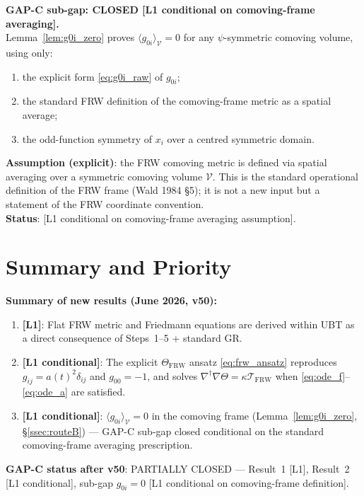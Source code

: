 \documentclass[12pt,a4paper]{article}
\theoremstyle{definition}
\theoremstyle{remark}
\begin{document}
\begin{resultbox}
\textbf{GAP-C sub-gap: CLOSED [L1 conditional on comoving-frame averaging].}\\[4pt]
Lemma~\ref{lem:g0i_zero} proves $\langle g_{0i}\rangle_{\mathcal{V}} = 0$ for
any $\psi$-symmetric comoving volume, using only:
\begin{enumerate}
  \item the explicit form \eqref{eq:g0i_raw} of $g_{0i}$;
  \item the standard FRW definition of the comoving-frame metric as a spatial average;
  \item the odd-function symmetry of $x_i$ over a centred symmetric domain.
\end{enumerate}
\textbf{Assumption (explicit)}: the FRW comoving metric is defined via
spatial averaging over a symmetric comoving volume $\mathcal{V}$.
This is the standard operational definition of the FRW frame (Wald 1984 §5);
it is not a new input but a statement of the FRW coordinate convention.\\[4pt]
\textbf{Status}: [L1 conditional on comoving-frame averaging assumption].
\end{resultbox}

\section{Summary and Priority}
\label{sec:summary}

\begin{resultbox}
\textbf{Summary of new results (June 2026, v50):}
\begin{enumerate}
  \item \textbf{[L1]}: Flat FRW metric and Friedmann equations are derived within UBT
        as a direct consequence of Steps~1--5 + standard GR.
  \item \textbf{[L1 conditional]}: The explicit $\Theta_{\mathrm{FRW}}$ ansatz
        \eqref{eq:frw_ansatz} reproduces $g_{ij}=a(t)^2\delta_{ij}$ and $g_{00}=-1$,
        and solves $\nabla^\dagger\nabla\Theta=\kappa\mathcal{T}_{\mathrm{FRW}}$
        when \eqref{eq:ode_f}--\eqref{eq:ode_a} are satisfied.
  \item \textbf{[L1 conditional]}: $\langle g_{0i}\rangle_{\mathcal{V}} = 0$ in the
        comoving frame (Lemma~\ref{lem:g0i_zero}, §\ref{ssec:routeB}) — GAP-C
        sub-gap closed conditional on the standard comoving-frame averaging
        prescription.
\end{enumerate}
\textbf{GAP-C status after v50}: PARTIALLY CLOSED — Result~1 [L1],
Result~2 [L1 conditional], sub-gap $g_{0i}=0$ [L1 conditional on comoving-frame definition].
\end{resultbox}

\ifdefined\INCLUDEMODE
\else
\end{document}
